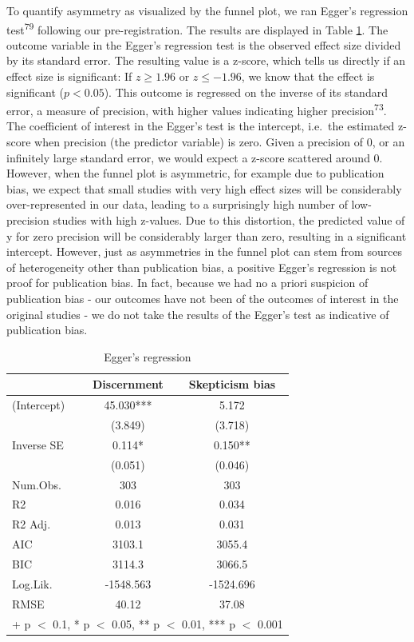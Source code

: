 \documentclass[
  doc,floatsintext]{apa6}
\begin{document}
To quantify asymmetry as visualized by the funnel plot, we ran Egger's regression test\textsuperscript{79} following our pre-registration. The results are displayed in Table \ref{tab:egger}. The outcome variable in the Egger's regression test is the observed effect size divided by its standard error. The resulting value is a z-score, which tells us directly if an effect size is significant: If \(z \geq 1.96\) or \(z \leq -1.96\), we know that the effect is significant (\(p < 0.05\)). This outcome is regressed on the inverse of its standard error, a measure of precision, with higher values indicating higher precision\textsuperscript{73}. The coefficient of interest in the Egger's test is the intercept, i.e.~the estimated z-score when precision (the predictor variable) is zero. Given a precision of 0, or an infinitely large standard error, we would expect a z-score scattered around 0. However, when the funnel plot is asymmetric, for example due to publication bias, we expect that small studies with very high effect sizes will be considerably over-represented in our data, leading to a surprisingly high number of low-precision studies with high z-values. Due to this distortion, the predicted value of y for zero precision will be considerably larger than zero, resulting in a significant intercept. However, just as asymmetries in the funnel plot can stem from sources of heterogeneity other than publication bias, a positive Egger's regression is not proof for publication bias. In fact, because we had no a priori suspicion of publication bias - our outcomes have not been of the outcomes of interest in the original studies - we do not take the results of the Egger's test as indicative of publication bias.

\begin{table}

\caption{\label{tab:egger}Egger's regression}
\centering
\begin{tabular}[t]{lcc}
\toprule
  & Discernment & Skepticism  bias\\
\midrule
(Intercept) & 45.030*** & 5.172\\
 & (3.849) & (3.718)\\
Inverse SE & 0.114* & 0.150**\\
 & (0.051) & (0.046)\\
\midrule
Num.Obs. & 303 & 303\\
R2 & 0.016 & 0.034\\
R2 Adj. & 0.013 & 0.031\\
AIC & 3103.1 & 3055.4\\
BIC & 3114.3 & 3066.5\\
Log.Lik. & -1548.563 & -1524.696\\
RMSE & 40.12 & 37.08\\
\bottomrule
\multicolumn{3}{l}{\rule{0pt}{1em}+ p $<$ 0.1, * p $<$ 0.05, ** p $<$ 0.01, *** p $<$ 0.001}\\
\end{tabular}
\end{table}
\end{document}
